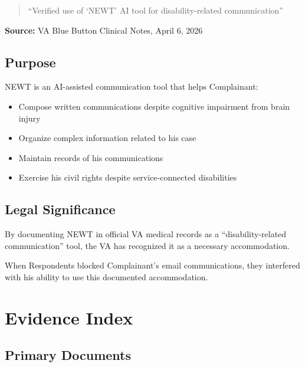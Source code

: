 \documentclass[12pt,letterpaper]{article}
\begin{document}
\begin{quote}
``Verified use of `NEWT' AI tool for disability-related communication''
\end{quote}

\textbf{Source:} VA Blue Button Clinical Notes, April 6, 2026

\subsection{Purpose}

NEWT is an AI-assisted communication tool that helps Complainant:
\begin{itemize}[noitemsep]
    \item Compose written communications despite cognitive impairment from brain injury
    \item Organize complex information related to his case
    \item Maintain records of his communications
    \item Exercise his civil rights despite service-connected disabilities
\end{itemize}

\subsection{Legal Significance}

By documenting NEWT in official VA medical records as a ``disability-related communication'' tool, the VA has recognized it as a necessary accommodation.

When Respondents blocked Complainant's email communications, they interfered with his ability to use this documented accommodation.

\newpage

\section{Evidence Index}

\subsection{Primary Documents}
\end{document}
